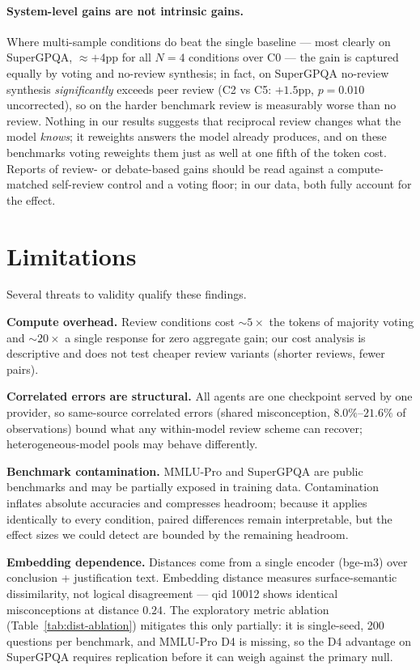 \documentclass[11pt]{article}
\begin{document}
\paragraph{System-level gains are not intrinsic gains.}
Where multi-sample conditions do beat the single baseline --- most clearly on SuperGPQA, ${\approx}+4$pp for all $N{=}4$ conditions over C0 --- the gain is captured equally by voting and no-review synthesis; in fact, on SuperGPQA no-review synthesis \emph{significantly} exceeds peer review (C2 vs C5: $+1.5$pp, $p=0.010$ uncorrected), so on the harder benchmark review is measurably worse than no review. Nothing in our results suggests that reciprocal review changes what the model \emph{knows}; it reweights answers the model already produces, and on these benchmarks voting reweights them just as well at one fifth of the token cost. Reports of review- or debate-based gains should be read against a compute-matched self-review control and a voting floor; in our data, both fully account for the effect.

\section{Limitations}
\label{sec:limitations}

Several threats to validity qualify these findings.

\textbf{Compute overhead.} Review conditions cost ${\sim}5\times$ the tokens of majority voting and ${\sim}20\times$ a single response for zero aggregate gain; our cost analysis is descriptive and does not test cheaper review variants (shorter reviews, fewer pairs).

\textbf{Correlated errors are structural.} All agents are one checkpoint served by one provider, so same-source correlated errors (shared misconception, $8.0\%$--$21.6\%$ of observations) bound what any within-model review scheme can recover; heterogeneous-model pools may behave differently.

\textbf{Benchmark contamination.} MMLU-Pro and SuperGPQA are public benchmarks and may be partially exposed in training data. Contamination inflates absolute accuracies and compresses headroom; because it applies identically to every condition, paired differences remain interpretable, but the effect sizes we could detect are bounded by the remaining headroom.

\textbf{Embedding dependence.} Distances come from a single encoder (bge-m3) over conclusion + justification text. Embedding distance measures surface-semantic dissimilarity, not logical disagreement --- qid 10012 shows identical misconceptions at distance $0.24$. The exploratory metric ablation (Table~\ref{tab:dist-ablation}) mitigates this only partially: it is single-seed, 200 questions per benchmark, and MMLU-Pro D4 is missing, so the D4 advantage on SuperGPQA requires replication before it can weigh against the primary null.
\end{document}
